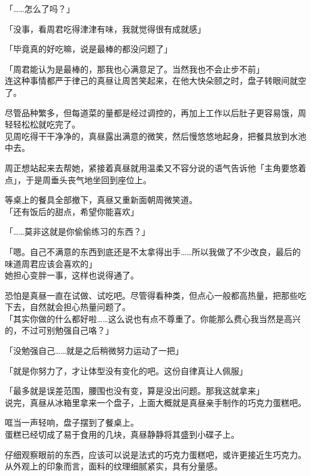 「……怎么了吗？」

「没事，看周君吃得津津有味，我就觉得很有成就感」

「毕竟真的好吃嘛，说是最棒的都没问题了」

「周君能认为是最棒的，那我也心满意足了。当然我也不会止步不前」\\

连这种事情都严于律己的真昼让周苦笑起来，在他大快朵颐之时，盘子转眼间就空了。

尽管品种繁多，但每道菜的量都是经过调控的，再加上工作以后肚子更容易饿，周轻轻松松就吃完了。\\

见周吃得干干净净的，真昼露出满意的微笑，然后慢悠悠地起身，把餐具放到水池中去。

周正想站起来去帮她，紧接着真昼就用温柔又不容分说的语气告诉他「主角要悠着点」，于是周垂头丧气地坐回到座位上。

等桌上的餐具全部撤下，真昼又重新面朝周微笑道。\\

「还有饭后的甜点，希望你能喜欢」

「……莫非这就是你偷偷练习的东西？」

「嗯。自己不满意的东西到底还是不太拿得出手……所以我做了不少改良，最后的味道周君应该会喜欢的」\\

她担心变胖一事，这样也说得通了。

恐怕是真昼一直在试做、试吃吧。尽管得看种类，但点心一般都高热量，把那些吃下去，自然就会担心热量问题了。\\

「其实你做的什么都好啦……这么说也有点不尊重了。你能那么费心我当然是高兴的，不过可别勉强自己咯？」

「没勉强自己……就是之后稍微努力运动了一把」

「就是你努力了，才让体型没有变化的吧。这份自律真让人佩服」

「最多就是误差范围，腰围也没有变，算是没出问题。那我这就拿来」\\

说完，真昼从冰箱里拿来一个盘子，上面大概就是真昼亲手制作的巧克力蛋糕吧。

哐当一声轻响，盘子摆到了餐桌上。\\

蛋糕已经切成了易于食用的几块，真昼静静将其盛到小碟子上。

仔细观察眼前的东西，应该可以说是法式的巧克力蛋糕吧，或许更接近生巧克力。从外观上的印象而言，面料的纹理细腻紧实，具有分量感。\\

